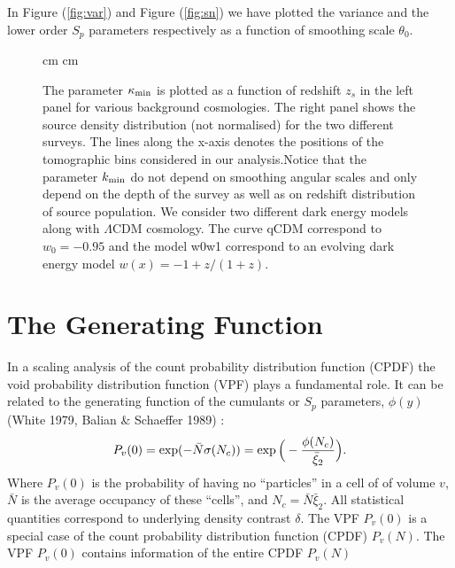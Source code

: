 \documentclass[usenatbib]{mn2e}
\def\n{\noindent}
\begin{document}
In Figure (\ref{fig:var}) and Figure (\ref{fig:sn}) we have plotted the variance and the lower order $S_p$ parameters
respectively as a function of smoothing scale $\theta_0$.
%
\begin{figure}
\begin{center}
{ cm  cm
{}}
\end{center}
\caption{The parameter $\kappa_{\rm min}$ is plotted as a function of redshift $z_s$ in the left panel for various
background cosmologies. The right panel shows the source density distribution (not normalised) for the two different surveys. The
lines along the x-axis denotes the positions of the tomographic bins considered in our analysis.Notice that
the parameter $k_{\rm min}$ do not depend on smoothing angular scales and only depend on the depth of the survey
as well as on redshift distribution of source population. We consider two different dark energy models along with
$\Lambda$CDM cosmology. The curve qCDM correspond to $w_0=-0.95$ and the model w0w1 correspond to an evolving dark
energy model $w(x)=-1 + z/(1+z)$.}
\label{fig:kmin}
\end{figure}
%
\section{The Generating Function}
\label{gen}
%
In a scaling analysis of the count probability distribution function (CPDF) the
void probability distribution function (VPF) plays a fundamental 
role. It can be related to the generating function of the cumulants 
or $S_p$ parameters, $\phi(y)$ (White 1979, Balian \& Schaeffer 1989) :
\begin{equation}
P_v(0) = \exp ( -\bar N \sigma(N_c) ) = \exp \Big ( - { \phi (N_c) \over
\bar \xi_2} \Big  ).
\label{eq:scale}
\end{equation}
\n
Where $P_v(0)$ is the probability of having no ``particles'' in a cell of 
of volume $v$, $\bar N$ is the average occupancy of these ``cells'', and 
$N_c = \bar N {\bar \xi}_2$. 
All statistical quantities correspond to underlying density contrast $\delta$. The VPF  $P_v(0)$ is a special case of the count probability
distribution function (CPDF) $P_v(N)$. The VPF $P_v(0)$ contains information of the entire CPDF $P_v(N)$ 
\end{document}
